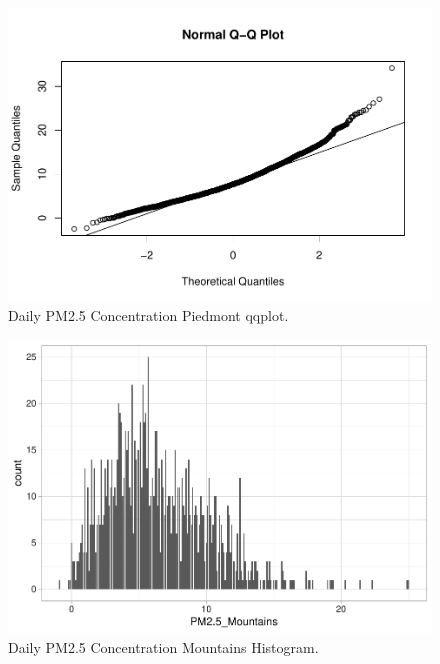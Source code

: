 \documentclass[12pt,]{article}
\begin{document}
\begin{figure}
\centering
\includegraphics{Raby_ENV872_Project_files/figure-latex/unnamed-chunk-45-1.pdf}
\caption{Daily PM2.5 Concentration Piedmont qqplot.
\label{Piedmontqqplot}}
\end{figure}

\begin{figure}
\centering
\includegraphics{Raby_ENV872_Project_files/figure-latex/unnamed-chunk-46-1.pdf}
\caption{Daily PM2.5 Concentration Mountains Histogram.
\label{Mounthistplot}}
\end{figure}
\end{document}
